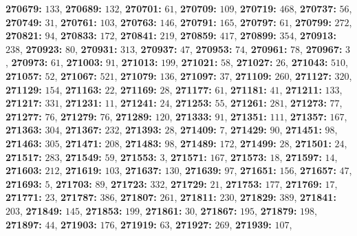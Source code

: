 \textsf{\bfseries 270679:} $133$, \textsf{\bfseries 270689:} $132$, \textsf{\bfseries 270701:} $61$, \textsf{\bfseries 270709:} $109$, \textsf{\bfseries 270719:} $468$, \textsf{\bfseries 270737:} $56$, \textsf{\bfseries 270749:} $31$, \textsf{\bfseries 270761:} $103$, \textsf{\bfseries 270763:} $146$, \textsf{\bfseries 270791:} $165$, \textsf{\bfseries 270797:} $61$, \textsf{\bfseries 270799:} $272$, \textsf{\bfseries 270821:} $94$, \textsf{\bfseries 270833:} $172$, \textsf{\bfseries 270841:} $219$, \textsf{\bfseries 270859:} $417$, \textsf{\bfseries 270899:} $354$, \textsf{\bfseries 270913:} $238$, \textsf{\bfseries 270923:} $80$, \textsf{\bfseries 270931:} $313$, \textsf{\bfseries 270937:} $47$, \textsf{\bfseries 270953:} $74$, \textsf{\bfseries 270961:} $78$, \textsf{\bfseries 270967:} $3$, \textsf{\bfseries 270973:} $61$, \textsf{\bfseries 271003:} $91$, \textsf{\bfseries 271013:} $199$, \textsf{\bfseries 271021:} $58$, \textsf{\bfseries 271027:} $26$, \textsf{\bfseries 271043:} $510$, \textsf{\bfseries 271057:} $52$, \textsf{\bfseries 271067:} $521$, \textsf{\bfseries 271079:} $136$, \textsf{\bfseries 271097:} $37$, \textsf{\bfseries 271109:} $260$, \textsf{\bfseries 271127:} $320$, \textsf{\bfseries 271129:} $154$, \textsf{\bfseries 271163:} $22$, \textsf{\bfseries 271169:} $28$, \textsf{\bfseries 271177:} $61$, \textsf{\bfseries 271181:} $41$, \textsf{\bfseries 271211:} $133$, \textsf{\bfseries 271217:} $331$, \textsf{\bfseries 271231:} $11$, \textsf{\bfseries 271241:} $24$, \textsf{\bfseries 271253:} $55$, \textsf{\bfseries 271261:} $281$, \textsf{\bfseries 271273:} $77$, \textsf{\bfseries 271277:} $76$, \textsf{\bfseries 271279:} $76$, \textsf{\bfseries 271289:} $120$, \textsf{\bfseries 271333:} $91$, \textsf{\bfseries 271351:} $111$, \textsf{\bfseries 271357:} $167$, \textsf{\bfseries 271363:} $304$, \textsf{\bfseries 271367:} $232$, \textsf{\bfseries 271393:} $28$, \textsf{\bfseries 271409:} $7$, \textsf{\bfseries 271429:} $90$, \textsf{\bfseries 271451:} $98$, \textsf{\bfseries 271463:} $305$, \textsf{\bfseries 271471:} $208$, \textsf{\bfseries 271483:} $98$, \textsf{\bfseries 271489:} $172$, \textsf{\bfseries 271499:} $28$, \textsf{\bfseries 271501:} $24$, \textsf{\bfseries 271517:} $283$, \textsf{\bfseries 271549:} $59$, \textsf{\bfseries 271553:} $3$, \textsf{\bfseries 271571:} $167$, \textsf{\bfseries 271573:} $18$, \textsf{\bfseries 271597:} $14$, \textsf{\bfseries 271603:} $212$, \textsf{\bfseries 271619:} $103$, \textsf{\bfseries 271637:} $130$, \textsf{\bfseries 271639:} $97$, \textsf{\bfseries 271651:} $156$, \textsf{\bfseries 271657:} $47$, \textsf{\bfseries 271693:} $5$, \textsf{\bfseries 271703:} $89$, \textsf{\bfseries 271723:} $332$, \textsf{\bfseries 271729:} $21$, \textsf{\bfseries 271753:} $177$, \textsf{\bfseries 271769:} $17$, \textsf{\bfseries 271771:} $23$, \textsf{\bfseries 271787:} $386$, \textsf{\bfseries 271807:} $261$, \textsf{\bfseries 271811:} $230$, \textsf{\bfseries 271829:} $389$, \textsf{\bfseries 271841:} $203$, \textsf{\bfseries 271849:} $145$, \textsf{\bfseries 271853:} $199$, \textsf{\bfseries 271861:} $30$, \textsf{\bfseries 271867:} $195$, \textsf{\bfseries 271879:} $198$, \textsf{\bfseries 271897:} $44$, \textsf{\bfseries 271903:} $176$, \textsf{\bfseries 271919:} $63$, \textsf{\bfseries 271927:} $269$, \textsf{\bfseries 271939:} $107$, 
